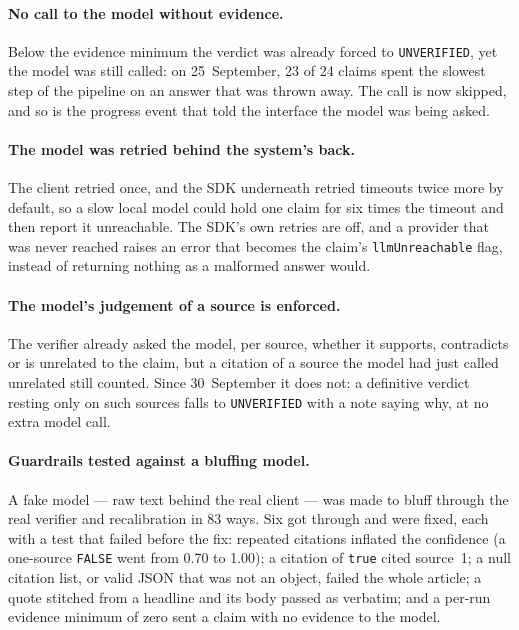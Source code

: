 \paragraph{No call to the model without evidence.} Below the evidence
minimum the verdict was already forced to \texttt{UNVERIFIED}, yet the
model was still called: on 25~September, 23 of 24 claims spent the
slowest step of the pipeline on an answer that was thrown away. The
call is now skipped, and so is the progress event that told the
interface the model was being asked.

\paragraph{The model was retried behind the system's back.} The client
retried once, and the SDK underneath retried timeouts twice more by
default, so a slow local model could hold one claim for six times the
timeout and then report it unreachable. The SDK's own retries are off,
and a provider that was never reached raises an error that becomes the
claim's \texttt{llmUnreachable} flag, instead of returning nothing as a
malformed answer would.

\paragraph{The model's judgement of a source is enforced.} The verifier
already asked the model, per source, whether it supports, contradicts
or is unrelated to the claim, but a citation of a source the model had
just called unrelated still counted. Since 30~September it does not: a
definitive verdict resting only on such sources falls to
\texttt{UNVERIFIED} with a note saying why, at no extra model call.

\paragraph{Guardrails tested against a bluffing model.} A fake model ---
raw text behind the real client --- was made to bluff through the real
verifier and recalibration in 83 ways. Six got through and were fixed,
each with a test that failed before the fix: repeated citations
inflated the confidence (a one-source \texttt{FALSE} went from 0.70 to
1.00); a citation of \texttt{true} cited source~1; a null citation
list, or valid JSON that was not an object, failed the whole article; a
quote stitched from a headline and its body passed as verbatim; and a
per-run evidence minimum of zero sent a claim with no evidence to the
model.

